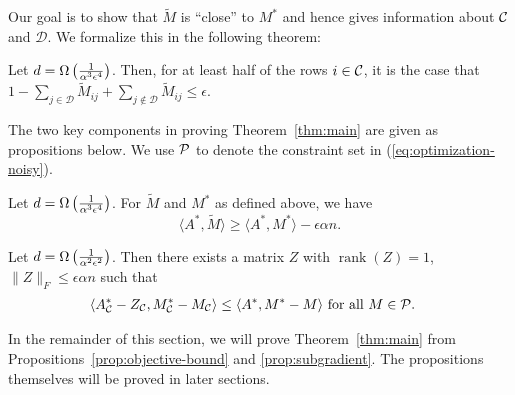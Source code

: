 \documentclass[11pt]{article}
\newcommand{\M}{\tilde{M}}
\newcommand{\Mm}{M^*}
\newcommand{\Aa}{A^*}
\newcommand{\sD}{\mathcal{D}}
\DeclareMathOperator{\rank}{rank}
\begin{document}
Our goal is to show that $\M$ is ``close'' to $M^*$ and hence gives information about $\mathcal{C}$ and $\sD$. 
We formalize this in the following theorem:
\begin{theorem}
\label{thm:main}
Let $d = \Omega\left(\frac{1}{\alpha^3\epsilon^4}\right)$. Then, for at least 
half of the rows $i \in \mathcal{C}$, it is the case that 
$1 - \sum_{j \in \sD} \M_{ij} + \sum_{j \not\in \sD} \M_{ij} \leq \epsilon$.
\end{theorem}
The two key components in proving Theorem~\ref{thm:main} are 
given as propositions below.
We use $\mathcal{P}$ to denote the constraint set in (\ref{eq:optimization-noisy}).
\begin{proposition}
\label{prop:objective-bound}
Let $d = \Omega\left(\frac{1}{\alpha^3\epsilon^4}\right)$. For $\M$ and $\Mm$ as defined above, we have
\begin{equation}
\label{eq:objective-bound}
\langle \Aa, \M \rangle \geq \langle \Aa, \Mm \rangle - \epsilon \alpha n.
\end{equation}
\end{proposition}
\begin{proposition}
\label{prop:subgradient}
Let $d = \Omega\left(\frac{1}{\alpha^2\epsilon^2}\right)$. Then there exists a matrix $Z$ with 
$\rank(Z) = 1$, $\|Z\|_F \leq \epsilon \alpha n$ such that
\begin{align}
\langle \Aa_{\sC} - Z_{\sC}, \Mm_{\sC} - M_{\sC} \rangle &\leq \langle \Aa, \Mm - M \rangle \text{ for all $M \in \sP$}.
\end{align}
\end{proposition}
In the remainder of this section, we will prove Theorem~\ref{thm:main} from Propositions~\ref{prop:objective-bound} 
and \ref{prop:subgradient}. The propositions themselves will be proved in later sections.
\end{document}
